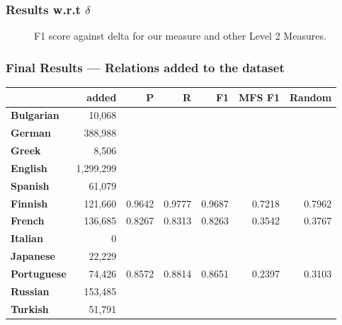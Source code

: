 \documentclass{beamer}
\begin{document}
\begin{frame}
	\frametitle{Results w.r.t \(\delta\)}
	\begin{figure}
	\centering
	        
	\caption{\scriptsize F1 score against delta for our measure and other Level 2 Measures.}
	\label{fig.2}
	\end{figure}
\end{frame}

\begin{frame}
	\frametitle{Final Results — Relations added to the dataset}

\begin{center}\begin{footnotesize}\begin{tabular}{lrrrrrr}
&\textbf{added}&\textbf{P}&\textbf{R}&\textbf{F1}&\textbf{MFS F1}&\textbf{Random}\\
\hline
\textbf{Bulgarian}	&	10,068	\\
\textbf{German}	&	388,988	\\
\textbf{Greek}	&	8,506	\\
\textbf{English}	&	1,299,299	\\
\textbf{Spanish}	&	61,079	\\
\textbf{Finnish}	&	121,660	&0.9642&0.9777&0.9687&0.7218&0.7962\\
\textbf{French}	&	136,685	&0.8267&0.8313&0.8263&0.3542&0.3767 \\
\textbf{Italian}	&	0	\\
\textbf{Japanese}	&	22,229	\\
\textbf{Portuguese}	&	74,426	&0.8572&0.8814&0.8651&0.2397&0.3103 \\
\textbf{Russian}	&	153,485	\\
\textbf{Turkish}	&	51,791	\\
\hline
\end{tabular}
\end{footnotesize}\end{center}

\end{frame}
\end{document}
